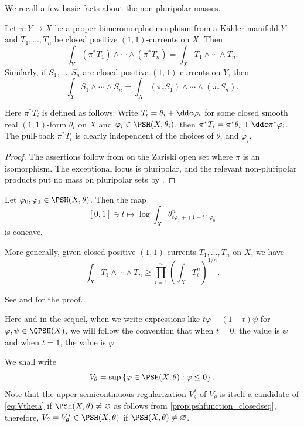 We recall a few basic facts about the non-pluripolar masses.
\begin{proposition}\label{prop:nppmassinv}
    Let $\pi\colon Y\rightarrow X$ be a proper bimeromorphic morphism from a K\"ahler manifold $Y$ and $T_1,\ldots,T_n$ be closed positive $(1,1)$-currents on $X$. Then
    \[
        \int_Y (\pi^*T_1)\wedge \cdots \wedge (\pi^*T_n)=\int_X T_1\wedge \cdots \wedge T_n.
    \]
    Similarly, if $S_1,\ldots,S_n$ are closed positive $(1,1)$-currents on $Y$, then
    \[
        \int_Y S_1\wedge \cdots \wedge S_n=\int_X \left(\pi_*S_1\right)\wedge \cdots \wedge \left(\pi_*S_n\right).
    \]
\end{proposition}
Here $\pi^*T_i$ is defined as follows: Write $T_i=\theta_i+\ddc \varphi_i$ for some closed smooth real $(1,1)$-form $\theta_i$ on $X$ and $\varphi_i\in \PSH(X,\theta_i)$, then $\pi^*T_i=\pi^*\theta_i+\ddc \pi^*\varphi_i$. The pull-back $\pi^*T_i$ is clearly independent of the choices of $\theta_i$ and $\varphi_i$.
\begin{proof}
    The assertions follow from  on the Zariski open set where $\pi$ is an isomorphism. The exceptional locus is pluripolar, and the relevant non-pluripolar products put no mass on pluripolar sets by .
\end{proof}

\begin{theorem}\label{thm:logconc}
    Let $\varphi_0,\varphi_1\in \PSH(X,\theta)$. Then the map
    \[
    [0,1] \ni t\mapsto \log\int_X \theta_{t\varphi_1+(1-t)\varphi_0}^n
    \]
    is concave. 
    
    More generally, given closed positive $(1,1)$-currents $T_1,\ldots,T_n$ on $X$, we have
    \[
        \int_X T_1\wedge \cdots \wedge T_n\geq \prod_{i=1}^n \left( \int_X T_i^n \right)^{1/n}.
    \]
\end{theorem}
See \cite{DDNL19log} and \cite[Theorem~17.4.23]{FPT} for the proof.
\begin{remark}\label{rmk:linearcompsh}
    Here and in the sequel, when we write expressions like $t\varphi+(1-t)\psi$ for $\varphi,\psi\in \QPSH(X)$, we will follow the convention that when $t=0$, the value is $\psi$ and when $t=1$, the value is $\varphi$.
\end{remark}

We shall write
\begin{equation}\label{eq:Vtheta}
    V_{\theta}=\sup\left\{ \varphi\in \PSH(X,\theta):\varphi\leq 0 \right\}.
\end{equation}
Note that the upper semicontinuous regularization $V_{\theta}^*$ of $V_{\theta}$ is itself a candidate of \eqref{eq:Vtheta} if $\PSH(X,\theta)\neq \varnothing$ as follows from \cref{prop:pshfunction_closedseq}, therefore, $V_{\theta}=V_{\theta}^*\in \PSH(X,\theta)$ if $\PSH(X,\theta)\neq \varnothing$.




